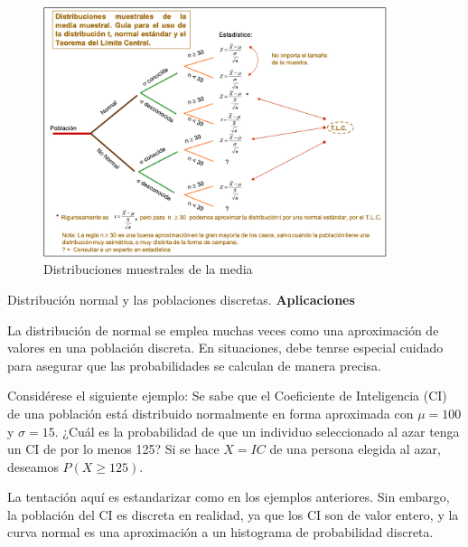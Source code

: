 \documentclass[
  10pt,
  ignorenonframetext,
]{beamer}
\begin{document}
\begin{frame}{}
\protect\hypertarget{section-32}{}
\begin{figure}
\centering
\includegraphics[width=0.9\textwidth,height=\textheight]{figuras/dist-muest-media.png}
\caption{Distribuciones muestrales de la media}
\end{figure}
\end{frame}

\begin{frame}{Distribución normal y las poblaciones discretas.}
\protect\hypertarget{distribuciuxf3n-normal-y-las-poblaciones-discretas.}{}
\textbf{Aplicaciones}

La distribución de normal se emplea muchas veces como una aproximación
de valores en una población discreta. En situaciones, debe tenrse
especial cuidado para asegurar que las probabilidades se calculan de
manera precisa.

Considérese el siguiente ejemplo: Se sabe que el Coeficiente de
Inteligencia (CI) de una población está distribuido normalmente en forma
aproximada con \(\mu =100\) y \(\sigma = 15\). ¿Cuál es la probabilidad
de que un individuo seleccionado al azar tenga un CI de por lo menos
125? Si se hace \(X = IC\) de una persona elegida al azar, deseamos
\(P(X \ge 125)\).

La tentación aquí es estandarizar como en los ejemplos anteriores. Sin
embargo, la población del CI es discreta en realidad, ya que los CI son
de valor entero, y la curva normal es una aproximación a un histograma
de probabilidad discreta.
\end{frame}
\end{document}
